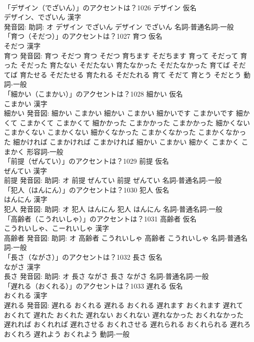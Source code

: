 \documentclass[8pt]{extreport}
\begin{document}
\begin{CJK}{UTF8}{min}
\\	「デザイン（でざいん）」のアクセントは？1026	デザイン 仮名　
\\	デザイン、でざいん 漢字　
\\	発音図: 助詞: オ	デザイン でざいん		デザイン でざいん				名詞-普通名詞-一般 
\\	「育つ（そだつ）」のアクセントは？1027	育つ 仮名　
\\	そだつ 漢字　
\\	育つ 発音図:	育つ そだつ		育つ そだつ 育ちます そだちます 育って そだって 育った そだった 育たない そだたない 育たなかった そだたなかった 育てば そだてば 育たせる そだたせる 育たれる そだたれる 育て そだて 育とう そだとう				動詞-一般 
\\	「細かい（こまかい）」のアクセントは？1028	細かい 仮名　
\\	こまかい 漢字　
\\	細かい 発音図:	細かい こまかい		細かい こまかい 細かいです こまかいです 細かくて こまかくて こまかくて 細かかった こまかかった こまかかった 細かくない こまかくない こまかくない 細かくなかった こまかくなかった こまかくなかった 細かければ こまかければ こまかければ 細かい こまかい 細かく こまかく こまかく				形容詞-一般 
\\	「前提（ぜんてい）」のアクセントは？1029	前提 仮名　
\\	ぜんてい 漢字　
\\	前提 発音図: 助詞: オ	前提 ぜんてい		前提 ぜんてい				名詞-普通名詞-一般 
\\	「犯人（はんにん）」のアクセントは？1030	犯人 仮名　
\\	はんにん 漢字　
\\	犯人 発音図: 助詞: オ	犯人 はんにん		犯人 はんにん				名詞-普通名詞-一般 
\\	「高齢者（こうれいしゃ）」のアクセントは？1031	高齢者 仮名　
\\	こうれいしゃ、こーれいしゃ 漢字　
\\	高齢者 発音図: 助詞: オ	高齢者 こうれいしゃ		高齢者 こうれいしゃ				名詞-普通名詞-一般 
\\	「長さ（ながさ）」のアクセントは？1032	長さ 仮名　
\\	ながさ 漢字　
\\	長さ 発音図: 助詞: オ	長さ ながさ		長さ ながさ				名詞-普通名詞-一般 
\\	「遅れる（おくれる）」のアクセントは？1033	遅れる 仮名　
\\	おくれる 漢字　
\\	遅れる 発音図:	遅れる おくれる		遅れる おくれる 遅れます おくれます 遅れて おくれて 遅れた おくれた 遅れない おくれない 遅れなかった おくれなかった 遅れれば おくれれば 遅れさせる おくれさせる 遅れられる おくれられる 遅れろ おくれろ 遅れよう おくれよう				動詞-一般 

\end{CJK}
\end{document}
